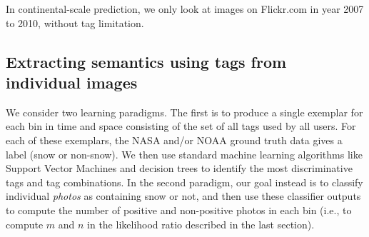 In continental-scale prediction, we only look at images on Flickr.com in year 2007 to 2010, without tag limitation. 

%




\subsection{Extracting semantics using tags from individual images}

We consider two learning paradigms. The first
is to produce a single exemplar for each bin in time and space
consisting of the set of all tags used by all users. For each of these
exemplars, the NASA and/or NOAA ground truth data gives a label (snow
or non-snow). We then use standard machine learning algorithms like
Support Vector Machines and decision trees to identify the most
discriminative tags and tag combinations. In the second paradigm, our
goal instead is to classify individual \textit{photos} as containing
snow or not, and then use these classifier outputs to compute the
number of positive and non-positive photos in each bin (i.e., to
compute $m$ and $n$ in the likelihood ratio described in the last
section).





